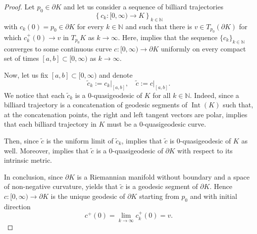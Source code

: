 \documentclass[11pt]{article}
\theoremstyle{definition}
\theoremstyle{remark}
\theoremstyle{plain}
\DeclareMathOperator{\Int}{Int}
\newcommand{\N}{\mathbb{N}}
\begin{document}
\begin{proof}

Let $p_0\in \partial K$ and let us consider a sequence of billiard trajectories 
$$\left\{c_k: [0,\infty)\rightarrow K\right\}_{k\in \N}$$
with $c_k(0) = p_0\in \partial K$ for every $k\in \N$ and such that there is $v\in T_{p_0}(\partial K)$ for which $c_k^+(0)\rightarrow v$  in $T_{p_0}K$ as $k\rightarrow \infty$.
Here,  implies that the sequence $\{c_k\}_{k\in \N}$ converges to some continuous curve $c:[0,\infty)\rightarrow \partial K$ uniformly on every compact set of times $[a,b]\subset [0,\infty)$ as $k\rightarrow \infty$. 

Now, let us fix $[a,b]\subset [0,\infty)$ and denote
$$\tilde c_k:= c_k\big|_{[a,b]},\quad \tilde c:= c\big|_{[a,b]}.$$
We notice that each $\tilde c_k$ is a $0$-quasigeodesic of $K$ for all $k\in \N$. Indeed, since a billiard trajectory is a concatenation of geodesic segments of $\Int(K)$ such that, at the concatenation points, the right and left tangent vectors are polar,  implies that each billiard trajectory in $K$ must be a $0$-quasigeodesic curve.

Then, since $\tilde c$ is the uniform limit of $\tilde c_k$,  implies that $\tilde c$ is $0$-quasigeodesic of $K$ as well. 
Moreover,  implies that $\tilde c$ is a $0$-quasigeodesic of $\partial K$ with respect to its intrinsic metric. 

In conclusion, since $\partial K$ is a Riemannian manifold without boundary and a space of non-negative curvature,  yields that $\tilde c$ is a geodesic segment of $\partial K$. Hence $c:[0,\infty)\rightarrow \partial K$ is the unique geodesic of $\partial K$ starting from $p_0$ and with initial direction
$$c^+(0) = \lim_{k\rightarrow \infty} c^+_k(0) = v.$$

\end{proof} 


\printbibliography
\end{document}
